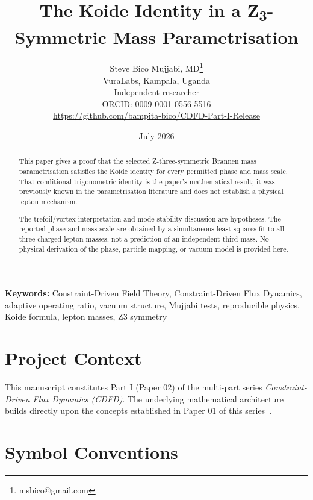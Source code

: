 \documentclass[11pt]{article}
\begin{document}
\title{The Koide Identity in a Z\textsubscript{3}-Symmetric Mass Parametrisation}

\author{Steve Bico Mujjabi, MD\thanks{msbico@gmail.com}\\
VuraLabs, Kampala, Uganda\\
Independent researcher\\
ORCID: \href{https://orcid.org/0009-0001-0556-5516}{0009-0001-0556-5516}\\
\url{https://github.com/bampita-bico/CDFD-Part-I-Release}}

\date{July 2026}

\maketitle

\begin{abstract}
This paper gives a proof that the selected Z-three-symmetric Brannen mass
parametrisation satisfies the Koide identity for every permitted phase and mass
scale. That conditional trigonometric identity is the paper's mathematical
result; it was previously known in the parametrisation literature and does not
establish a physical lepton mechanism.

The trefoil/vortex interpretation and mode-stability discussion are hypotheses.
The reported phase and mass scale are obtained by a simultaneous least-squares
fit to all three charged-lepton masses, not a prediction of an independent third
mass. No physical derivation of the phase, particle mapping, or vacuum model is
provided here.
\end{abstract}

\noindent\textbf{Keywords:} Constraint-Driven Field Theory, Constraint-Driven Flux Dynamics, adaptive operating ratio, vacuum structure, Mujjabi tests, reproducible physics, Koide formula, lepton masses, Z3 symmetry

\vspace{0.75em}
\linenumbers

\section*{Project Context}
This manuscript constitutes Part I (Paper 02) of the multi-part series
\textit{Constraint-Driven Flux Dynamics (CDFD)}. The underlying mathematical
architecture builds directly upon the concepts established in Paper 01 of this
series~\cite{MujjabiI2026}.

\section*{Symbol Conventions}
\end{document}

